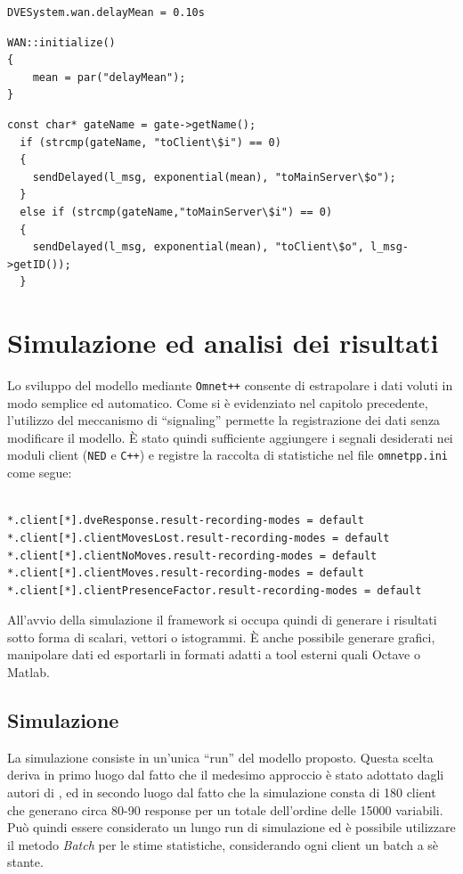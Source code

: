 \documentclass[a4paper, 11pt, oneside]{book}
\theoremstyle{definition}
\theoremstyle{remark}
\begin{document}
\begin{lstlisting}[title = {\texttt{omnetpp.ini}: definizione della media},
                  ]
DVESystem.wan.delayMean = 0.10s
\end{lstlisting}

\begin{lstlisting}[title = {\texttt{WAN.cc}: inizializzazione della media},
                  ]
WAN::initialize()
{
    mean = par("delayMean");
}
\end{lstlisting}

\begin{lstlisting}[title = {\texttt{WAN.cc}: tipico meccanismo di routing},
                  ]
  const char* gateName = gate->getName();
  if (strcmp(gateName, "toClient\$i") == 0)
  {
    sendDelayed(l_msg, exponential(mean), "toMainServer\$o");
  }
  else if (strcmp(gateName,"toMainServer\$i") == 0)
  {
    sendDelayed(l_msg, exponential(mean), "toClient\$o", l_msg->getID());
  }
\end{lstlisting}

\chapter{Simulazione ed analisi dei risultati}\label{analisi}
Lo sviluppo del modello mediante \texttt{Omnet++} consente di estrapolare
i dati voluti in modo semplice ed automatico. Come si è evidenziato nel
capitolo precedente, l'utilizzo del meccanismo di ``signaling'' permette la
registrazione dei dati senza modificare il modello. \`E stato quindi
sufficiente aggiungere i segnali desiderati nei moduli client (\texttt{NED} e
\texttt{C++}) e registre la raccolta di statistiche nel file
\texttt{omnetpp.ini} come segue:
\begin{lstlisting}

*.client[*].dveResponse.result-recording-modes = default
*.client[*].clientMovesLost.result-recording-modes = default
*.client[*].clientNoMoves.result-recording-modes = default
*.client[*].clientMoves.result-recording-modes = default
*.client[*].clientPresenceFactor.result-recording-modes = default
\end{lstlisting}

All'avvio della simulazione il framework si occupa quindi di generare i
risultati sotto forma di scalari, vettori o istogrammi. \`E anche possibile
generare grafici, manipolare dati ed esportarli in formati adatti a tool
esterni quali Octave o Matlab.

\section{Simulazione}
La simulazione consiste in un'unica ``run'' del modello proposto. Questa
scelta deriva in primo luogo dal fatto che il medesimo approccio è stato
adottato dagli autori di \cite{IDVE}, ed in secondo luogo dal fatto che
la simulazione consta di 180 client che generano circa 80-90 response per
un totale dell'ordine delle 15000 variabili. Può quindi essere considerato
un lungo run di simulazione ed è possibile utilizzare il metodo \emph{Batch}
per le stime statistiche, considerando ogni client un batch a sè stante.
\end{document}
